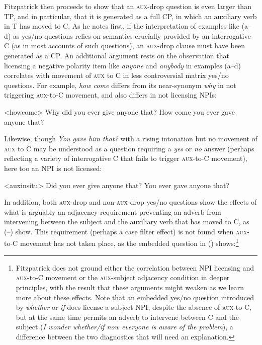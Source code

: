 \documentclass[output=paper]{langscibook}
\begin{document}
Fitzpatrick then proceeds to show that an \textsc{aux}-drop question is even larger than TP, and in particular, that it is generated as a full CP, in which an auxiliary verb in T has moved to C. As he notes first, if the interpretation of examples like (a--d) as yes/no questions relies on semantics crucially provided by an interrogative C (as in most accounts of such questions), an \textsc{aux-}drop clause must have been generated as a CP. An additional argument rests on the observation that licensing a negative polarity item like \textit{anyone} and \textit{anybody} in examples (a--d) correlates with movement of \textsc{aux} to C in less controversial matrix yes/no questions. For example, \textit{how come} differs from its near-synonym \textit{why} in not triggering \textsc{aux}-to-C movement, and also differs in not licensing NPIs:

\pex<howcome> 
\a Why did you ever give anyone that?
\a \ljudge{*}How come you ever gave anyone that? 
\xe

\noindent Likewise, though \textit{You gave him that?} with a rising intonation but no movement of \textsc{aux} to C may be understood as a question requiring a \textit{yes} or \textit{no} answer (perhaps reflecting a variety of interrogative C that fails to trigger \textsc{aux-}to-C movement), here too an NPI is not licensed:

\pex<auxinsitu>
\a Did you ever give anyone that?
\a \ljudge{*}You ever gave anyone that? 
\xe

\noindent In addition, both \textsc{aux}-drop and non-\textsc{aux}-drop yes/no questions show the effects of what is arguably an adjacency requirement preventing an adverb from intervening between the subject and the auxiliary verb that has moved to C, as (--) show. This requirement (perhaps a case filter effect) is not found when \textsc{aux-}to-C movement has not taken place, as the embedded question in () shows:\footnote{Fitzpatrick does not ground either the correlation between NPI licensing and \textsc{aux}-to-C movement or the \textsc{aux-}subject adjacency condition in deeper principles, with the result that these arguments might weaken as we learn more about these effects. Note that an embedded yes/no question introduced by \textit{whether} or \textit{if} does license a subject NPI, despite the absence of \textsc{aux}-to-C, but at the same time permits an adverb to intervene between C and the subject (\textit{I wonder whether/if now everyone is aware of the problem}), a difference between the two diagnostics that will need an explanation.}
\end{document}

